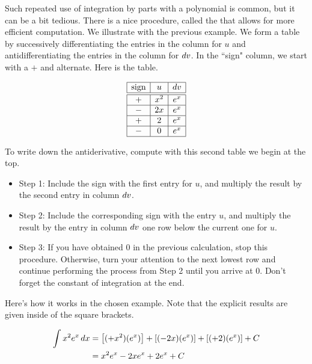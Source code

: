 \documentclass[noauthor]{ximera}
\begin{document}
\begin{remark}
Such repeated use of integration by parts with a polynomial is common, but
it can be a bit tedious. There is a nice procedure, called the  that allows for more efficient computation.  We illustrate with the
previous example.  We form a table by successively differentiating the entries
in the column for $u$ and antidifferentiating the entries in the column for $\mathop{}\!d v$.
In the ``sign" column, we start with a $+$ and alternate.  Here is the table.

\[
\begin{array}{|c|c|c|}\hline
\text{sign} & u & \mathop{}\!d v \\ \hline \hline
+ & x^2 & e^x \\ \hline
- & 2x & e^x \\ \hline
+ & 2  & e^x \\ \hline
- & 0  & e^x \\ \hline
\end{array}
\]

To write down the antiderivative, compute with this second table we begin at the top.

\begin{itemize}
\item Step 1: Include the sign with the first entry for $u$, and multiply the result by the second entry in column $\mathop{}\!d v$.
\item Step 2: Include the corresponding sign with the entry $u$, and multiply the result by the entry in column $\mathop{}\!d v$ one row below the current one for $u$.
\item Step 3: If you have obtained 0 in the previous calculation, stop this procedure. Otherwise, turn your attention to the next lowest row and continue performing the process from Step 2 until you arrive at 0.  Don't forget the constant of integration at the end.
\end{itemize}

Here's how it works in the chosen example.  Note that the explicit results are given inside of the square brackets.

\begin{align*}
\int x^2 e^x \mathop{}\!d x &= \left[(+x^2)(e^x)\right] + \left[(-2x)(e^x) \right] +\left[(+2)(e^x)\right] + C\\
&= x^2 e^x - 2xe^x + 2e^x +C
\end{align*}

\end{remark}
\end{document}
